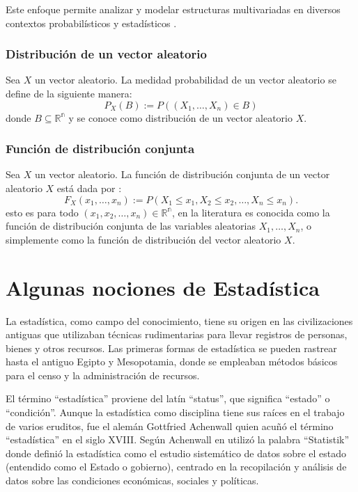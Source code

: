 \documentclass[
  us-letterpaper,
]{scrreprt}
\theoremstyle{plain}
\theoremstyle{definition}
\theoremstyle{definition}
\theoremstyle{remark}
\begin{document}
Este enfoque permite analizar y modelar estructuras multivariadas en
diversos contextos probabilísticos y estadísticos
\autocite{casella2002statistical}.

\subsection{Distribución de un vector
aleatorio}\label{distribuciuxf3n-de-un-vector-aleatorio}

Sea \(X\) un vector aleatorio. La medidad probabilidad de un vector
aleatorio se define de la siguiente manera: \[ 
P_X(B) := P((X_1,\dots, X_n) \in B )
\] donde \(B \subseteq \mathbb{R^n}\) y se conoce como distribución de
un vector aleatorio \(X\).

\subsection{Función de distribución
conjunta}\label{funciuxf3n-de-distribuciuxf3n-conjunta}

Sea \(X\) un vector aleatorio. La función de distribución conjunta de un
vector aleatorio \(X\) está dada por : \[
F_X(x_1,\dots, x_n) := P(X_1 \leq x_1,X_2 \leq x_2, \dots, X_n \leq x_n).
\] esto es para todo \((x_1,x_2,\dots, x_n) \in \mathbb{R^n}\), en la
literatura es conocida como la función de distribución conjunta de las
variables aleatorias \(X_1,\dots,X_n\), o simplemente como la función de
distribución del vector aleatorio \(X\).

\chapter{Algunas nociones de
Estadística}\label{algunas-nociones-de-estaduxedstica}

La estadística, como campo del conocimiento, tiene su origen en las
civilizaciones antiguas que utilizaban técnicas rudimentarias para
llevar registros de personas, bienes y otros recursos. Las primeras
formas de estadística se pueden rastrear hasta el antiguo Egipto y
Mesopotamia, donde se empleaban métodos básicos para el censo y la
administración de recursos.

El término ``estadística'' proviene del latín ``status'', que significa
``estado'' o ``condición''. Aunque la estadística como disciplina tiene
sus raíces en el trabajo de varios eruditos, fue el alemán Gottfried
Achenwall quien acuñó el término ``estadística'' en el siglo XVIII.
Según Achenwall en \autocite{putter1750elementa} utilizó la palabra
``Statistik'' donde definió la estadística como el estudio sistemático
de datos sobre el estado (entendido como el Estado o gobierno), centrado
en la recopilación y análisis de datos sobre las condiciones económicas,
sociales y políticas.
\end{document}
